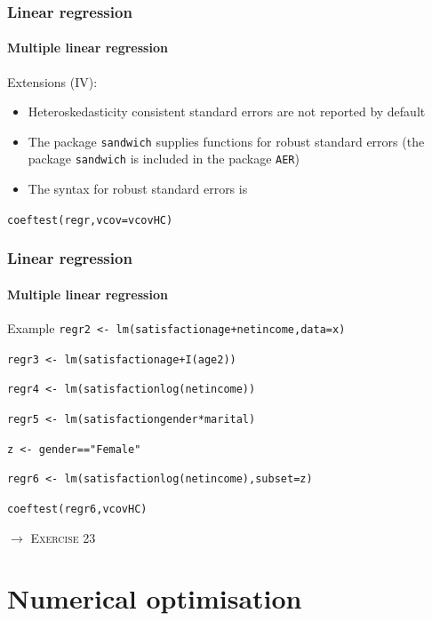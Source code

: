 \documentclass[title={Introduction to R}, author={Mutschler and Zaharieva}, inst={Institute for Econometrics and Empirical Economics}]{beamer}
\begin{document}
\begin{frame}
\frametitle{Linear regression}
\framesubtitle{Multiple linear regression}
Extensions (IV):
\begin{itemize}
\item Heteroskedasticity consistent standard errors are not reported by default
\item The package \texttt{sandwich} supplies functions for robust standard
errors (the package \texttt{sandwich} is included in the package \texttt{AER})
\item The syntax for robust standard errors is
\end{itemize}
\begin{center}
\texttt{coeftest(regr,vcov=vcovHC)}
\end{center}
\end{frame}


\begin{frame}
\frametitle{Linear regression}
\framesubtitle{Multiple linear regression}
\begin{block}{Example}
\texttt{regr2 <- lm(satisfactionage+netincome,data=x)}

\texttt{regr3 <- lm(satisfactionage+I(age2))}

\texttt{regr4 <- lm(satisfactionlog(netincome))}

\texttt{regr5 <- lm(satisfactiongender*marital)}

\texttt{z <- gender=="Female"}

\texttt{regr6 <- lm(satisfactionlog(netincome),subset=z)}

\texttt{coeftest(regr6,vcovHC)}

\end{block}\pause
$\longrightarrow $ \textsc{Exercise 23}
\end{frame}

\section{Numerical optimisation}
\end{document}
